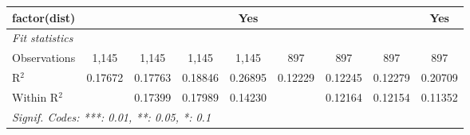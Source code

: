\begin{table}[htbp]
\begin{tabular}{lcccccccc}
      factor(dist)              &                         &                         &                         & Yes                    &                         &                         &                         & Yes\\  
      \midrule
      \emph{Fit statistics}\\
      Observations              & 1,145                   & 1,145                   & 1,145                   & 1,145                  & 897                     & 897                     & 897                     & 897\\  
      R$^2$                     & 0.17672                 & 0.17763                 & 0.18846                 & 0.26895                & 0.12229                 & 0.12245                 & 0.12279                 & 0.20709\\  
      Within R$^2$              &                         & 0.17399                 & 0.17989                 & 0.14230                &                         & 0.12164                 & 0.12154                 & 0.11352\\  
      \midrule \midrule
      \multicolumn{9}{l}{\emph{Signif. Codes: ***: 0.01, **: 0.05, *: 0.1}}\\
   \end{tabular}
\end{table}



